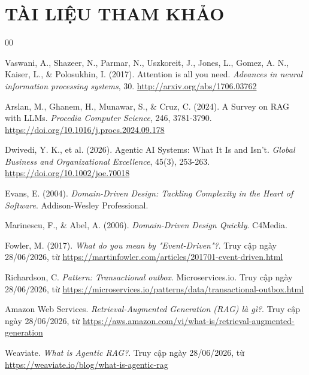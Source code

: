 \newpage
{}
{\centering \section*{TÀI LIỆU THAM KHẢO}}

\begingroup
\renewcommand{\section}[2]{} %
\begin{thebibliography}{00}

Vaswani, A., Shazeer, N., Parmar, N., Uszkoreit, J., Jones, L., Gomez, A. N., Kaiser, L., \& Polosukhin, I. (2017). Attention is all you need. \textit{Advances in neural information processing systems}, 30. \url{http://arxiv.org/abs/1706.03762}

Arslan, M., Ghanem, H., Munawar, S., \& Cruz, C. (2024). A Survey on RAG with LLMs. \textit{Procedia Computer Science}, 246, 3781-3790. \url{https://doi.org/10.1016/j.procs.2024.09.178}

Dwivedi, Y. K., et al. (2026). Agentic AI Systems: What It Is and Isn't. \textit{Global Business and Organizational Excellence}, 45(3), 253-263. \url{https://doi.org/10.1002/joe.70018}

Evans, E. (2004). \textit{Domain-Driven Design: Tackling Complexity in the Heart of Software}. Addison-Wesley Professional.

Marinescu, F., \& Abel, A. (2006). \textit{Domain-Driven Design Quickly}. C4Media.

Fowler, M. (2017). \textit{What do you mean by "Event-Driven"?}. Truy cập ngày 28/06/2026, từ \url{https://martinfowler.com/articles/201701-event-driven.html}

Richardson, C. \textit{Pattern: Transactional outbox}. Microservices.io. Truy cập ngày 28/06/2026, từ \url{https://microservices.io/patterns/data/transactional-outbox.html}

Amazon Web Services. \textit{Retrieval-Augmented Generation (RAG) là gì?}. Truy cập ngày 28/06/2026, từ \url{https://aws.amazon.com/vi/what-is/retrieval-augmented-generation}

Weaviate. \textit{What is Agentic RAG?}. Truy cập ngày 28/06/2026, từ \url{https://weaviate.io/blog/what-is-agentic-rag}


\end{thebibliography}
